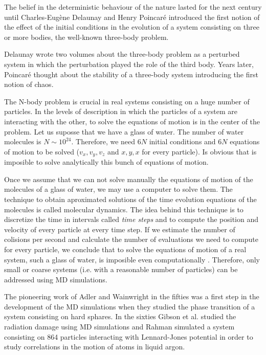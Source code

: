 \documentclass[b5paper,openright,10pt]{book}
\begin{document}
The belief in the deterministic behaviour of the nature lasted for the next century until Charles-Eugène Delaunay and Henry Poincaré introduced the first notion of the effect of the initial conditions in the evolution of a system consisting on three or more bodies, the well-known three-body problem. 

Delaunay wrote two volumes \cite{Delaunay1860} about the three-body problem as a perturbed system in which the perturbation played the role of the third body. 
Years later, Poincaré thought about the stability of a three-body system introducing the first notion of chaos. 

The N-body problem is crucial in real systems consisting on a huge number of particles. In the levels of description in which the particles of a system are interacting with the other, to solve the equations of motion is in the center of the problem. Let us suposse that we have a glass of water. 
The number of water molecules is $N \sim 10^{24}$. Therefore, we need  $6N$ initial conditions and $6N$ equations of motion to be solved ($v_x,v_y,v_z$ and $x,y,x$ for every particle). Is obvious that is imposible to solve analytically this bunch of equations of motion.

Once we assume that we can not solve manually the equations of motion of the molecules of a glass of water, we may use a computer to solve them. 
The technique to obtain aproximated solutions of the time evolution equations of the molecules is called molecular dynamics.
The idea behind this technique is to discretize the time in intervals called \textit{time steps} and to compute the position and velocity of every particle at every time step. If we estimate the number of colisions per second and calculate the number of evaluations we need to compute for every particle, we conclude that to solve the equations of motion of a real system, such a glass of water, is imposible even computationally \cite{TesisArturo}.
Therefore, only small or coarse systems (i.e. with a reasonable number of particles) can be addressed using MD simulations. 

The pioneering work of Adler and Wainwright \cite{Alder1957} in the fifties was a first step in the development of the MD simulations when they studied the phase transition of a system consisting on hard sphares. In the sixties Gibson et al. \cite{Gibson1960} studied the radiation damage using MD simulations and  Rahman \cite{Rahman1964} simulated a system consisting on 864 particles interacting with Lennard-Jones potential in order to study correlations in the motion of atoms in liquid argon.  
\end{document}
